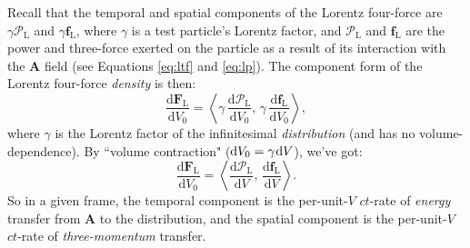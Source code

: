 \documentclass[12pt]{article}
\renewcommand{\vv}[1]{\mathbf{#1}}
\newcommand{\dd}[1]{\mathrm{d}#1}
\begin{document}
Recall that the temporal and spatial components of the Lorentz four-force are $\gamma \mathcal{P}_{\mathrm{L}}$ and $\gamma \vv f_{\textrm{L}}$, where $\gamma$ is a test particle's Lorentz factor, and $\mathcal{P}_{\mathrm{L}}$ and $\vv f_{\textrm{L}}$ are the power and three-force exerted on the particle as a result of its interaction with the $\vv A$ field (see Equations  \ref{eq:ltf} and \ref{eq:lp}). The component form of the Lorentz four-force \emph{density} is then:
\begin{equation*}
\dfrac{\dd \vv F_{\mathrm{L}}}{\dd V_0} = \left \langle \gamma \, \dfrac{\dd \mathcal{P}_{\textrm{L}} }{\dd V_0}, \, \gamma \, \dfrac{\dd \vv f_{\textrm{L}}}{\dd V_0} \right \rangle,
\end{equation*}
where $\gamma$ is the Lorentz factor of the infinitesimal \emph{distribution} (and has no volume-dependence). By ``volume contraction" ($\dd V_0 = \gamma \mkern1mu \dd V$), we've got:
\begin{equation}\label{eq:lffdc}
\dfrac{\dd \vv F_{\mathrm{L}}}{\dd V_0} = \left \langle \dfrac{\dd \mathcal{P}_{\mathrm{L}}}{\dd V}, \, \dfrac{\dd \vv f_{\mathrm{L}}}{\dd V} \right \rangle .
\end{equation}
So in a given frame, the temporal component is the per-unit-$V$ $ct$-rate of \emph{energy} transfer from $\vv A$ to the distribution, and the spatial component is the per-unit-$V$ $ct$-rate of \emph{three-momentum} transfer.
\end{document}

